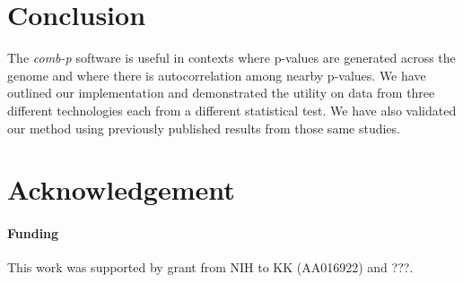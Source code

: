 \documentclass{bioinfo}
\begin{document}
\section{Conclusion}

The \textit{comb-p} software is useful in contexts where p-values are
generated across the genome and where there is autocorrelation among
nearby p-values. We have outlined our implementation and demonstrated
the utility on data from three different technologies each from a
different statistical test. We have also validated our method using
previously published results from those same studies.

\section*{Acknowledgement}

\paragraph{Funding\textcolon} This work was supported by grant from NIH to KK (AA016922) and  ???.

%
%
%
%
%
%
%
\end{document}
